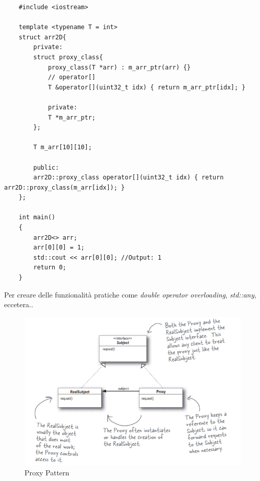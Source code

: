 \begin{lstlisting}
	#include <iostream>
	
	template <typename T = int>
	struct arr2D{
		private:
		struct proxy_class{
			proxy_class(T *arr) : m_arr_ptr(arr) {}
			// operator[]
			T &operator[](uint32_t idx) { return m_arr_ptr[idx]; }
			
			private:
			T *m_arr_ptr;
		};
		
		T m_arr[10][10];
		
		public:
		arr2D::proxy_class operator[](uint32_t idx) { return arr2D::proxy_class(m_arr[idx]); }
	};
	
	int main()
	{
		arr2D<> arr;
		arr[0][0] = 1;
		std::cout << arr[0][0]; //Output: 1
		return 0;
	}
\end{lstlisting}

\textsf{\small Per creare delle funzionalità pratiche come \emph{double operator overloading}, \emph{std::any}, eccetera..} \\

\begin{figure}[H]
	\centering
	\includegraphics[width=1.2\textwidth, height=1.2\textheight, keepaspectratio]{./imgs/Design_Patterns/Proxy_Pattern.png}
	\caption{Proxy Pattern}
	\label{fig:Proxy_Pattern}
\end{figure}

